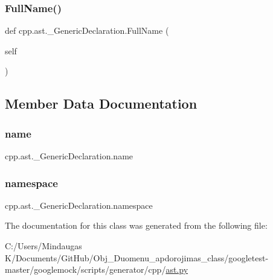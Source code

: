\mbox{\label{classcpp_1_1ast_1_1___generic_declaration_a1437d31271ea8cda62da22e2ce427a85}} 
\subsubsection{\texorpdfstring{FullName()}{FullName()}}
{\footnotesize\ttfamily def cpp.\+ast.\+\_\+\+Generic\+Declaration.\+Full\+Name (\begin{DoxyParamCaption}\item[{}]{self }\end{DoxyParamCaption})}



\subsection{Member Data Documentation}
\mbox{\label{classcpp_1_1ast_1_1___generic_declaration_af774f4729dfd78d0538a6782fe8514c1}} 
\subsubsection{\texorpdfstring{name}{name}}
{\footnotesize\ttfamily cpp.\+ast.\+\_\+\+Generic\+Declaration.\+name}

\mbox{\label{classcpp_1_1ast_1_1___generic_declaration_a8aee3f11b37449d54b42a78e0a689f46}} 
\subsubsection{\texorpdfstring{namespace}{namespace}}
{\footnotesize\ttfamily cpp.\+ast.\+\_\+\+Generic\+Declaration.\+namespace}



The documentation for this class was generated from the following file\+:\begin{DoxyCompactItemize}
\item 
C\+:/\+Users/\+Mindaugas K/\+Documents/\+Git\+Hub/\+Obj\+\_\+\+Duomenu\+\_\+apdorojimas\+\_\+class/googletest-\/master/googlemock/scripts/generator/cpp/\mbox{\hyperlink{googletest-master_2googlemock_2scripts_2generator_2cpp_2ast_8py}{ast.\+py}}\end{DoxyCompactItemize}
